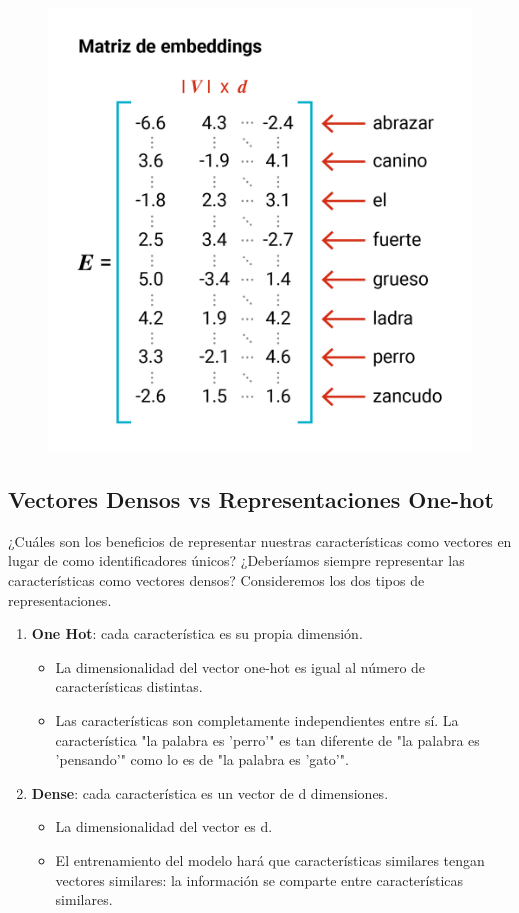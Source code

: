 \begin{figure}[htb]
	\centering
	 \includegraphics[scale=0.65]{pics/emb_matrix2.png}
\end{figure}



\subsection{Vectores Densos vs Representaciones One-hot}
¿Cuáles son los beneficios de representar nuestras características como vectores en lugar de como identificadores únicos? ¿Deberíamos siempre representar las características como vectores densos? Consideremos los dos tipos de representaciones.

\begin{enumerate}
 \item \textbf{One Hot}: cada característica es su propia dimensión.
 \begin{itemize}
  \item La dimensionalidad del vector one-hot es igual al número de características distintas.
  \item  Las características son completamente independientes entre sí. La característica "la palabra es 'perro'" es tan diferente de "la palabra es 'pensando'" como lo es de "la palabra es 'gato'".
 \end{itemize}
\item \textbf{Dense}: cada característica es un vector de d dimensiones.
\begin{itemize}
 \item La dimensionalidad del vector es d.
 \item El entrenamiento del modelo hará que características similares tengan vectores similares: la información se comparte entre características similares.
\end{itemize}
\end{enumerate}




